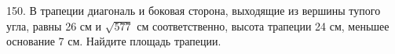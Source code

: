 150. В трапеции диагональ и боковая сторона, выходящие из вершины тупого угла, равны 26 см и $\sqrt{577}$ см соответственно, высота трапеции 24 см, меньшее основание 7 см. Найдите площадь трапеции.\\

